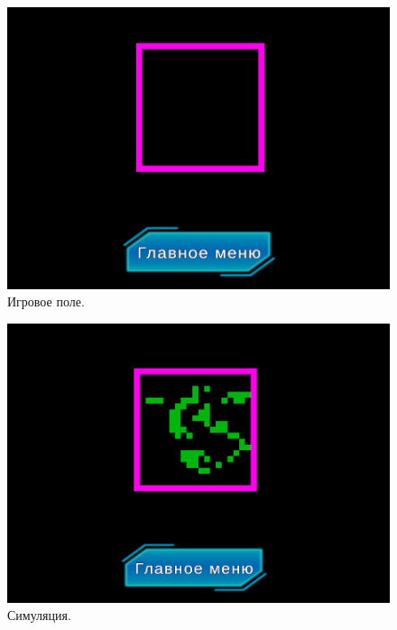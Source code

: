 \begin{figure}[H]
	\centering
	\includegraphics[width=1\textwidth]{images/map.png}  
	\caption{Игровое поле.}
	\label{map}
\end{figure}

\begin{figure}[H]
	\centering
	\includegraphics[width=1\textwidth]{images/rand2.png}  
	\caption{Симуляция.}
	\label{uim}
\end{figure}